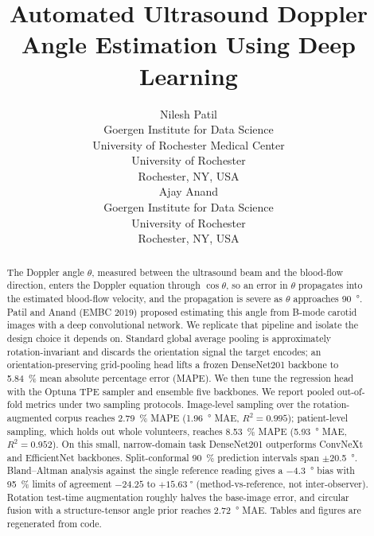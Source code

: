 \documentclass{article}
\title{Automated Ultrasound Doppler Angle Estimation Using Deep Learning}
\author{%
  Nilesh Patil \\
  Goergen Institute for Data Science\\
  University of Rochester Medical Center\\
  University of Rochester\\
  Rochester, NY, USA \\
  \And
  Ajay Anand \\
  Goergen Institute for Data Science\\
  University of Rochester\\
  Rochester, NY, USA \\
}
\begin{document}
\maketitle

\begin{center}
\vspace{-0.8em}
\vspace{0.6em}
\end{center}

\begin{abstract}
The Doppler angle $\theta$, measured between the ultrasound beam and the
blood-flow direction, enters the Doppler equation through $\cos\theta$, so an
error in $\theta$ propagates into the estimated blood-flow velocity, and the
propagation is severe as $\theta$ approaches \SI{90}{\degree}. Patil and Anand
(EMBC 2019) proposed estimating this angle from B-mode carotid images with a
deep convolutional network. We replicate that pipeline and isolate the design
choice it depends on. Standard global average pooling is approximately
rotation-invariant and discards the orientation signal the target encodes; an
orientation-preserving grid-pooling head lifts a frozen DenseNet201 backbone to
\SI{5.84}{\percent} mean absolute percentage error (MAPE). We then tune the
regression head with the Optuna TPE sampler and ensemble five backbones. We
report pooled out-of-fold metrics under two sampling protocols. Image-level
sampling over the rotation-augmented corpus reaches \SI{2.79}{\percent} MAPE
(\SI{1.96}{\degree} MAE, $R^2=0.995$); patient-level sampling, which holds out
whole volunteers, reaches \SI{8.53}{\percent} MAPE (\SI{5.93}{\degree} MAE,
$R^2=0.952$). On this small, narrow-domain task DenseNet201 outperforms
ConvNeXt and EfficientNet backbones. Split-conformal \SI{90}{\percent}
prediction intervals span $\pm$\SI{20.5}{\degree}. Bland--Altman analysis
against the single reference reading gives a \SI{-4.3}{\degree} bias with
\SI{95}{\percent} limits of agreement $-24.25$ to $+\SI{15.63}{\degree}$
(method-vs-reference, not inter-observer). Rotation test-time augmentation
roughly halves the base-image error, and circular fusion with a structure-tensor
angle prior reaches \SI{2.72}{\degree} MAE. Tables and figures are regenerated
from code.
\end{abstract}


\FloatBarrier

\FloatBarrier

\FloatBarrier

\FloatBarrier

\FloatBarrier



\end{document}

